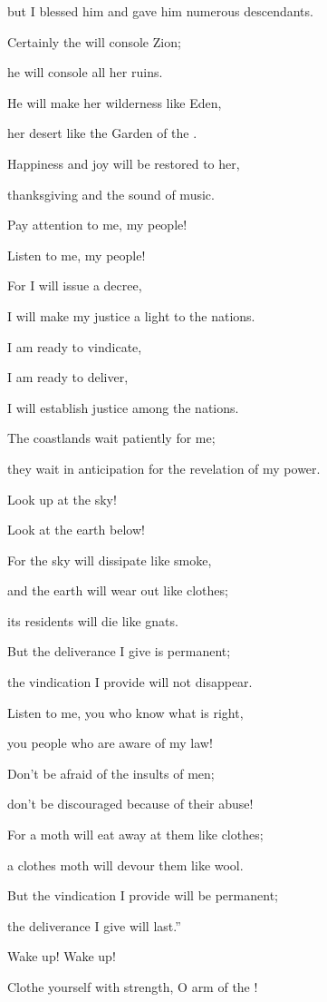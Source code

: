 {\par }{\Q but I blessed
him and gave him numerous descendants.
\par }{\Q {}Certainly
the {}
will console
Zion;
\par }{\Q he will console
all
her ruins.
\par }{\Q He will make
her wilderness
like Eden,
\par }{\Q her desert
like the Garden
of the {}.
\par }{\Q Happiness
and joy
will be restored
to her,
\par }{\Q thanksgiving
and the sound
of music.
\par }{\Q {}Pay attention
to me,
my people!
\par }{\Q Listen
to me,
my people!
\par }{\Q For
I will issue
a decree,
\par }{\Q I will make my
justice
a light
to the nations.
\par }{\Q {}I am ready
to vindicate,
\par }{\Q I am ready
to deliver,
\par }{\Q I will establish
justice
among
the nations.
\par }{\Q The coastlands
wait patiently
for me;
\par }{\Q they wait in anticipation
for
the revelation of my power.
\par }{\Q {}Look
up at the sky!
\par }{\Q Look
at the earth
below!
\par }{\Q For
the sky
will dissipate
like smoke,
\par }{\Q and the earth
will wear out
like clothes;
\par }{\Q its residents
will die
like
gnats.
\par }{\Q But the deliverance
I give is permanent;
\par }{\Q the vindication
I provide will
not
disappear.
\par }{\Q {}Listen
to me,
you who know
what is right,
\par }{\Q you people
who are aware
of my
law!

\par }{\Q Don’t
be afraid
of the insults
of men;
\par }{\Q don’t
be discouraged
because of their abuse!
\par }{\Q {}For
a moth
will eat
away at them like clothes;
\par }{\Q a clothes
moth
will devour
them like wool.
\par }{\Q But the vindication
I provide will be
permanent;
\par }{\Q the deliverance I give will last.”
\par }{\Q {}Wake up! Wake up!
\par }{\Q Clothe
yourself with strength,
O arm
of the
{}!

}
